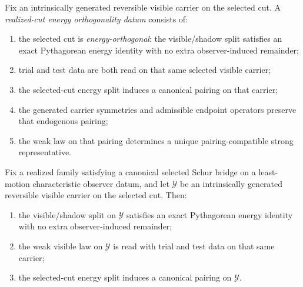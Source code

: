 \begin{definition}
\label{def:realized-cut-energy-orthogonality}
Fix an intrinsically generated reversible visible carrier on the selected cut.
A \emph{realized-cut energy orthogonality datum} consists of:
\begin{enumerate}[label=(\roman*), leftmargin=2em, itemsep=0.2em]
\item the selected cut is \emph{energy-orthogonal}: the visible/shadow split
      satisfies an exact Pythagorean energy identity with no extra
      observer-induced remainder;
\item trial and test data are both read on that same selected visible carrier;
\item the selected-cut energy split induces a canonical pairing on that
      carrier;
\item the generated carrier symmetries and admissible endpoint operators
      preserve that endogenous pairing;
\item the weak law on that pairing determines a unique pairing-compatible
      strong representative.
\end{enumerate}
\end{definition}

\begin{theorem}
\label{thm:canonical-selected-schur-bridge-forces-exact-selected-cut-energy-split}
Fix a realized family satisfying a canonical selected Schur bridge on a
least-motion characteristic observer datum, and let \(\mathcal Y\) be an
intrinsically generated reversible visible carrier on the selected cut. Then:
\begin{enumerate}[label=(\alph*), leftmargin=2em, itemsep=0.2em]
\item the visible/shadow split on \(\mathcal Y\) satisfies an exact
      Pythagorean energy identity with no extra observer-induced remainder;
\item the weak visible law on \(\mathcal Y\) is read with trial and test data
      on that same carrier;
\item the selected-cut energy split induces a canonical pairing on
      \(\mathcal Y\).
\end{enumerate}
\end{theorem}

